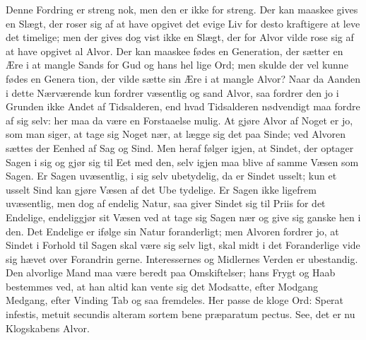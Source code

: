 \documentclass[12pt]{book}
\newcommand{\opage}[1]{\marginnote{\footnotesize\textit{[#1]}}}
\begin{document}
\opage{13}\setcounter{footnote}{0}%
Denne Fordring er streng nok, men den er ikke for
streng. Der kan maaskee gives en Slægt, der roser sig
af at have opgivet det evige Liv for desto kraftigere at
leve det timelige; men der gives dog vist ikke en
Slægt, der for Alvor vilde rose sig af at have opgivet
al Alvor. Der kan maaskee fødes en Generation, der
sætter en Ære i at mangle Sands for Gud og hans hel\-%
lige Ord; men skulde der vel kunne fødes en Genera\-%
tion, der vilde sætte sin Ære i at mangle Alvor? Naar
da Aanden i dette Nærværende kun fordrer væsentlig og
sand Alvor, saa fordrer den jo i Grunden ikke Andet af
Tidsalderen, end hvad Tidsalderen nødvendigt maa fordre af
sig selv: her maa da være en Forstaaelse mulig. At gjøre
Alvor af Noget er jo, som man siger, at tage sig Noget
nær, at lægge sig det paa Sinde; ved Alvoren sættes der
Eenhed af Sag og Sind. Men heraf følger igjen, at
Sindet, der optager Sagen i sig og gjør sig til Eet med
den, selv igjen maa blive af samme Væsen som Sagen.
Er Sagen uvæsentlig, i sig selv ubetydelig, da er Sindet
usselt; kun et usselt Sind kan gjøre Væsen af det Ube\-%
tydelige. Er Sagen ikke ligefrem uvæsentlig, men dog
af endelig Natur, saa giver Sindet sig til Priis for det
Endelige, endeliggjør sit Væsen ved at tage sig Sagen
nær og give sig ganske hen i den. Det Endelige er
ifølge sin Natur foranderligt; men Alvoren fordrer jo, at
Sindet i Forhold til Sagen skal være sig selv ligt, skal
midt i det Foranderlige vide sig hævet over Forandrin\-%
gerne. Interessernes og Midlernes Verden er ubestandig.
Den alvorlige Mand maa være beredt paa Omskiftelser;
hans Frygt og Haab bestemmes ved, at han altid kan
vente sig det Modsatte, efter Modgang Medgang, efter
Vinding Tab og saa fremdeles. Her passe de kloge
Ord: Sperat infestis, metuit secundis alteram sortem
\opage{14}\setcounter{footnote}{0}%
bene præparatum pectus. See, det er nu Klogskabens
Alvor.
\end{document}
